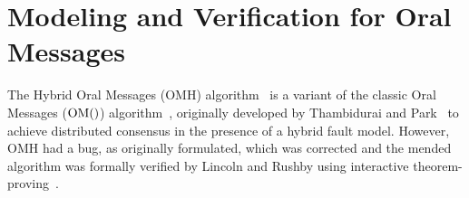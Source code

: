 \documentclass{llncs/llncs}
\newcommand{\OM}[1]{\ensuremath{\mathrm{OM}(#1)}\xspace}
\newcommand{\OMH}{\ensuremath{\mathrm{OMH}}\xspace}
\begin{document}

% 
% 
% 
% 




\section{Modeling and Verification for Oral Messages}\label{sec:byz}

The Hybrid Oral Messages ($\OMH$) algorithm~\cite{Lincoln-Rushby} is a variant of the classic Oral Messages ($\OM$) algorithm~\cite{om}, originally developed by Thambidurai and Park~\cite{hybrid} to achieve distributed consensus in the presence of a hybrid fault model. However, $\OMH$ had a bug, as originally formulated, which was corrected and the mended algorithm was formally verified by Lincoln and Rushby using interactive theorem-proving~\cite{Lincoln-Rushby}.
\end{document}

